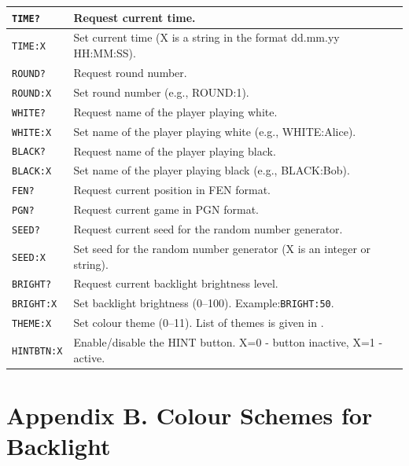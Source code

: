 \documentclass[a4paper,12pt]{article}
\begin{document}
\begin{longtable}{|p{}|p{}|}
\texttt{TIME?} & Request current time. \\ \hline
\texttt{TIME:X} & Set current time (X is a string in the format dd.mm.yy HH:MM:SS). \\ \hline
\texttt{ROUND?} & Request round number. \\ \hline
\texttt{ROUND:X} & Set round number (e.g., ROUND:1). \\ \hline
\texttt{WHITE?} & Request name of the player playing white. \\ \hline
\texttt{WHITE:X} & Set name of the player playing white (e.g., WHITE:Alice). \\ \hline
\texttt{BLACK?} & Request name of the player playing black. \\ \hline
\texttt{BLACK:X} & Set name of the player playing black (e.g., BLACK:Bob). \\ \hline
\texttt{FEN?} & Request current position in FEN format. \\ \hline
\texttt{PGN?} & Request current game in PGN format. \\ \hline
\texttt{SEED?} & Request current seed for the random number generator. \\ \hline
\texttt{SEED:X} & Set seed for the random number generator (X is an integer or string). \\ \hline
\texttt{BRIGHT?} & Request current backlight brightness level. \\ \hline
\texttt{BRIGHT:X} & Set backlight brightness (0–100). Example:\texttt{BRIGHT:50}. \\ \hline
\texttt{THEME:X} & Set colour theme (0–11). List of themes is given in \nameref{sec:themes}. \\ \hline
\texttt{HINTBTN:X} & Enable/disable the HINT button. X=0 - button inactive, X=1 - active. \\ \hline
\end{longtable}

\clearpage
\section*{Appendix B. Colour Schemes for Backlight}
\label{sec:themes}
\end{document}
